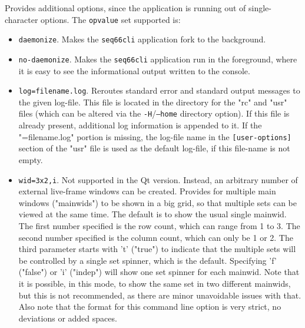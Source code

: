       Provides additional options, since the application is running out of
      single-character options.  The \texttt{opvalue} set supported is:
      \begin{itemize}
         \item \texttt{daemonize}.
            Makes the \texttt{seq66cli} application
            fork to the background.
         \item \texttt{no-daemonize}.
            Makes the \texttt{seq66cli} application
            run in the foreground, where it is easy to see the informational
            output written to the console.
         \item \texttt{log=filename.log}.
            Reroutes standard error and standard
            output messages to the given log-file.  This file is located in the
            directory for the "rc" and "usr" files (which can be altered via
            the \texttt{-H}/\texttt{--home} directory option).  If this file is
            already present, additional log information is appended to it.  If
            the "=filename.log" portion is missing, the log-file name in the
            \texttt{[user-options]} section of the "usr" file is used as the
            default log-file, if this file-name is not empty.
         \item \texttt{wid=3x2,i}.
            Not supported in the Qt version.  Instead, an arbitrary number of
            external live-frame windows can be created.
            Provides for multiple main windows ("mainwids") to be shown in a
            big grid, so that multiple sets can be viewed at the same time.
            The default is to show the usual single mainwid.
            The first number specified is the row count, which can range from 1
            to 3.  The second number specified is the column count, which can
            only be 1 or 2.  The third parameter starts with 't' ("true")
            to indicate that the multiple sets will be controlled by a single
            set spinner, which is the default.  Specifying 'f' ("false") or 'i'
            ("indep") will show one set spinner for each mainwid.  Note that it
            is possible, in this mode, to show the same set in two different
            mainwids, but this is not recommended, as there are minor
            unavoidable issues with that.  Also note that the format for this
            command line option is very strict, no deviations or added spaces.

\end{itemize}
